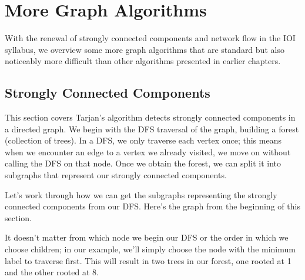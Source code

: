 \chapter{More Graph Algorithms}

With the renewal of strongly connected components and network flow in the IOI syllabus, we  overview some more graph algorithms that are standard but also noticeably more difficult than other algorithms presented in earlier chapters.

\section{Strongly Connected Components}

This section covers Tarjan's algorithm detects strongly connected components in a directed graph. We begin with the DFS traversal of the graph, building a forest (collection of trees). In a DFS, we only traverse each vertex once; this means when we encounter an edge to a vertex we already visited, we move on without calling the DFS on that node. Once we obtain the forest, we can split it into subgraphs that represent our strongly connected components.

Let's work through how we can get the subgraphs representing the strongly connected components from our DFS. Here's the graph from the beginning of this section.

\begin{center}
\end{center}

It doesn't matter from which node we begin our DFS or the order in which we choose children; in our example, we'll simply choose the node with the minimum label to traverse first. This will result in two trees in our forest, one rooted at 1 and the other rooted at 8.

